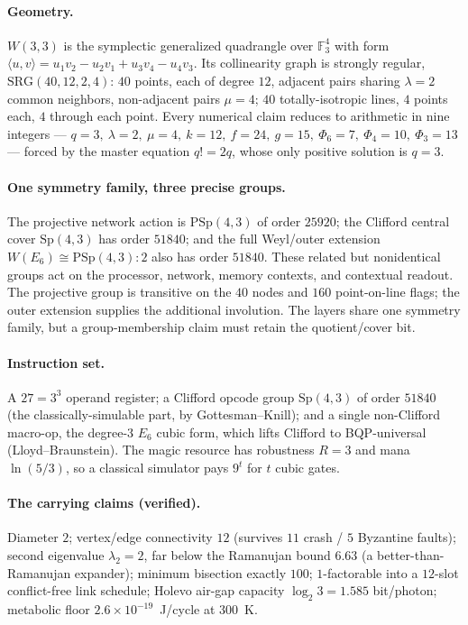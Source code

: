 \documentclass[11pt]{article}
\begin{document}
\paragraph{Geometry.} $W(3,3)$ is the symplectic generalized quadrangle over $\mathbb{F}_3^4$ with form
$\langle u,v\rangle = u_1v_2-u_2v_1+u_3v_4-u_4v_3$. Its collinearity graph is strongly regular,
$\mathrm{SRG}(40,12,2,4)$: $40$ points, each of degree $12$, adjacent pairs sharing $\lambda=2$ common
neighbors, non-adjacent pairs $\mu=4$; $40$ totally-isotropic lines, $4$ points each, $4$ through each
point. Every numerical claim reduces to arithmetic in nine integers --- $q=3,\ \lambda=2,\ \mu=4,\
k=12,\ f=24,\ g=15,\ \Phi_6=7,\ \Phi_4=10,\ \Phi_3=13$ --- forced by the master equation $q!=2q$, whose
only positive solution is $q=3$.

\paragraph{One symmetry family, three precise groups.} The projective network action is
$\mathrm{PSp}(4,3)$ of order $25920$; the Clifford central cover
$\mathrm{Sp}(4,3)$ has order $51840$; and the full Weyl/outer extension
$W(E_6)\cong\mathrm{PSp}(4,3){:}2$ also has order $51840$.  These related but nonidentical groups act on
the processor, network, memory contexts, and contextual readout.  The projective group is transitive on
the $40$ nodes and $160$ point-on-line flags; the outer extension supplies the additional involution.
The layers share one symmetry family, but a group-membership claim must retain the quotient/cover bit.

\paragraph{Instruction set.} A $27 = 3^3$ operand register; a Clifford opcode group
$\mathrm{Sp}(4,3)$ of order $51840$ (the classically-simulable part, by Gottesman--Knill); and a single
non-Clifford macro-op, the degree-$3$ $E_6$ cubic form, which lifts Clifford to BQP-universal
(Lloyd--Braunstein). The magic resource has robustness $R=3$ and mana $\ln(5/3)$, so a classical
simulator pays $9^{t}$ for $t$ cubic gates.

\paragraph{The carrying claims (verified).} Diameter $2$; vertex/edge connectivity $12$ (survives $11$
crash / $5$ Byzantine faults); second eigenvalue $\lambda_2=2$, far below the Ramanujan bound $6.63$
(a better-than-Ramanujan expander); minimum bisection exactly $100$; $1$-factorable into a $12$-slot
conflict-free link schedule; Holevo air-gap capacity $\log_2 3 = 1.585$ bit/photon; metabolic floor
$2.6\times10^{-19}$~J/cycle at $300$~K.
\end{document}
